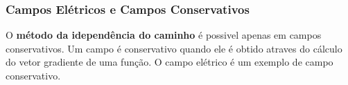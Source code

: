 \documentclass{beamer}
\def\vec{\mathaccent "017E\relax }
\begin{document}
\begin{frame}
% 
% 
% 
% 
% 
\end{frame}
% 

\begin{frame}
    \frametitle{Campos Elétricos e Campos Conservativos}
    
    O \textbf{método da idependência do caminho} é possivel apenas em campos conservativos. 
    Um campo é conservativo quando ele é obtido atraves do cálculo do vetor gradiente de uma função. 
    O campo elétrico é um exemplo de campo conservativo.
    

\end{frame}
\end{document}
